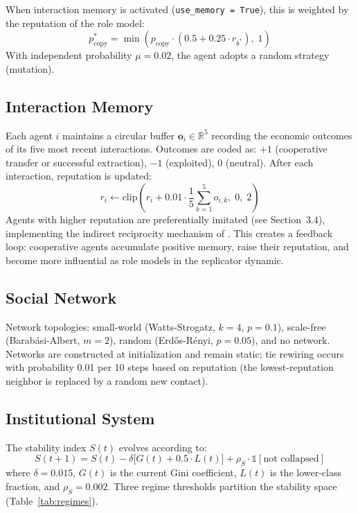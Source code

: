 \documentclass[12pt, letterpaper]{article}
\begin{document}
When interaction memory is activated (\texttt{use\_memory = True}), this
is weighted by the reputation of the role model:
\begin{equation}
  p_{\text{copy}}^* = \min\!\left(p_{\text{copy}} \cdot
    \left(0.5 + 0.25 \cdot r_{b^*}\right),\; 1\right)
\end{equation}
With independent probability $\mu = 0.02$, the agent adopts a random
strategy (mutation).

\subsection{Interaction Memory}
\label{sec:memory}

Each agent $i$ maintains a circular buffer $\mathbf{o}_i \in
\mathbb{R}^5$ recording the economic outcomes of its five most recent
interactions. Outcomes are coded as: $+1$ (cooperative transfer or
successful extraction), $-1$ (exploited), $0$ (neutral). After each
interaction, reputation is updated:
\begin{equation}
  r_i \leftarrow \text{clip}\!\left(r_i + 0.01 \cdot
    \frac{1}{5}\sum_{k=1}^{5} o_{i,k},\; 0,\; 2\right)
\end{equation}
Agents with higher reputation are preferentially imitated (see
Section~3.4), implementing the indirect reciprocity mechanism of
\citet{nowak1998indirect}. This creates a feedback loop: cooperative
agents accumulate positive memory, raise their reputation, and become
more influential as role models in the replicator dynamic.

\subsection{Social Network}

Network topologies: small-world (Watts-Strogatz, $k=4$, $p=0.1$),
scale-free (Barabási-Albert, $m=2$), random (Erdős-Rényi, $p=0.05$),
and no network. Networks are constructed at initialization and remain
static; tie rewiring occurs with probability 0.01 per 10 steps based on
reputation (the lowest-reputation neighbor is replaced by a random
new contact).

\subsection{Institutional System}

The stability index $S(t)$ evolves according to:
\begin{equation}
  S(t+1) = S(t) - \delta\bigl[G(t) + 0.5 \cdot L(t)\bigr]
    + \rho_S \cdot \mathbb{1}[\text{not collapsed}]
\end{equation}
where $\delta = 0.015$, $G(t)$ is the current Gini coefficient, $L(t)$
is the lower-class fraction, and $\rho_S = 0.002$. Three regime
thresholds partition the stability space (Table~\ref{tab:regimes}).
\end{document}

